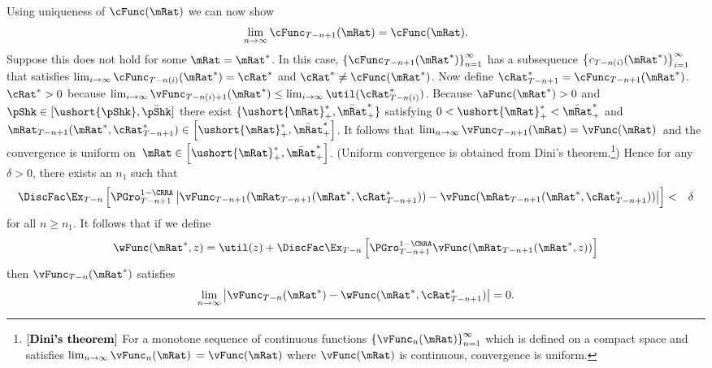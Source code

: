 \documentclass[titlepage]{\econtex}\providecommand{\texname}{BufferStockTheory}
\begin{document}
Using uniqueness of $\cFunc(\mRat)$ we can now show
\begin{equation}
\lim_{n\rightarrow \infty }\cFunc_{T-n+1}(\mRat) =\cFunc(\mRat).
\end{equation}
Suppose this does not hold for some $\mRat=\mRat^{*}$. In this case, $ \left\{
  \cFunc_{T-n+1}(\mRat^{*})\right\} _{n=1}^{\infty }$ has a subsequence $
\left\{ c_{T-n(i)}(\mRat^{*})\right\} _{i=1}^{\infty }$ that satisfies $
\lim_{i\rightarrow \infty }\cFunc_{T-n(i)}(\mRat^{*})=\cRat^{*}$ and $\cRat^{*}\neq
\cFunc(\mRat^{*})$. Now define $\cRat^{*} _{T-n+1}=\cFunc_{T-n+1}(\mRat^{*})$.  $\cRat^{*}>0$
because $\lim_{ i\rightarrow \infty }\vFunc_{T-n(i)+1}(\mRat^{*})\leq \lim_{
  i\rightarrow \infty }\util(\cRat^{*}_{T-n(i)})$. Because $\aFunc(\mRat^{*})>0$ and
$\pShk \in [\ushort{\pShk},\bar{\pShk}]$ there exist $\{
\ushort{\mRat}_{+}^{*},\bar{\mRat}_{+}^{*}\} $ satisfying $0<
\ushort{\mRat}_{+}^{*}<\bar{\mRat}_{+}^{*}$ and ${\mRat}_{T-n+1}( \mRat^{*},\cRat^{*}
_{T-n+1}) \in \left[ \ushort{\mRat}_{+}^{*},\bar{\mRat}_{+}^{*}\right]$.
It follows that $\lim_{n\rightarrow \infty }\vFunc_{T-n+1}(\mRat)=\vFunc(\mRat)$~and the
convergence is uniform on~$\mRat\in
\left[\ushort{\mRat}_{+}^{*},\bar{\mRat}_{+}^{*}\right]$. (Uniform
convergence is obtained from Dini's theorem.\footnote{$\left[
    \text{\textbf{Dini's theorem}}\right] $ For a monotone sequence of
  continuous functions $\left\{ \vFunc_{n}(\mRat)\right\} _{n=1}^{\infty }$
  which is defined on a compact space and satisfies
  $\lim_{n\rightarrow\infty }\vFunc_{n}(\mRat)$ $=\vFunc(\mRat)$ where $\vFunc(\mRat)$ is
  continuous, convergence is uniform.}) Hence for any $\delta >0$,
there exists an $n_{1}$ such that
\begin{eqnarray*}
\DiscFac \Ex_{T-n}\left[ {\PGro}_{T-n+1}^{1-\CRRA }\left\vert
\vFunc_{T-n+1}( {\mRat}_{T-n+1}( \mRat^{*},\cRat^{*}
_{T-n+1}) ) -\vFunc( {\mRat}_{T-n+1}( \mRat^{*},
\cRat^{*}_{T-n+1}) ) \right\vert \right]  &<&\delta \notag
\end{eqnarray*}
for all $n\geq n_{1}$. It follows that if we define
\begin{equation}
\wFunc( \mRat^{*},z) =\util(z)+\DiscFac \Ex_{T-n}\left[ {\PGro}_{T-n+1}^{1-\CRRA }\vFunc( {\mRat}_{T-n+1}( \mRat^{*}
,z) ) \right]
\end{equation}
then $\vFunc_{T-n}(\mRat^{*})$ satisfies
\begin{equation}
\lim_{n\rightarrow \infty }\left\vert \vFunc_{T-n}(\mRat^{*}
)-\wFunc( \mRat^{*},\cRat^{*}_{T-n+1}) \right\vert =0.
\label{Inequality1}
\end{equation}
\end{document}
